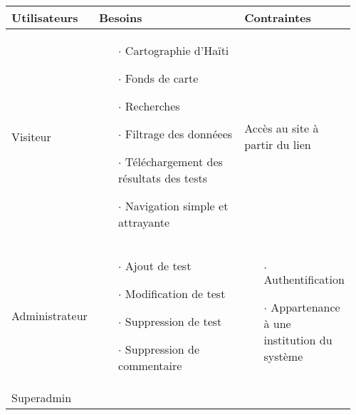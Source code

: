 \par    
\begin{table}
        \centering
        \begin{tabular}{|p{0.21\linewidth}|p{0.54\linewidth}|p{0.21\linewidth}|}
        \hline
                \textbf{Utilisateurs} & \textbf{Besoins} & 
                \textbf{Contraintes}  \\
                \hline
                        Visiteur & 
                        \begin{itemize}
                                 \item[$\cdot$]  Cartographie d'Haïti
                                 \item[$\cdot$]  Fonds de carte
                                 \item[$\cdot$]  Recherches
                                 \item[$\cdot$]  Filtrage des donnéees
                                 \item[$\cdot$]  Téléchargement des résultats des tests
                                 \item[$\cdot$]  Navigation simple et attrayante
                        \end{itemize} & 
                        Accès au site à partir du lien \\
                \hline
                        Administrateur & 
                        \begin{itemize}
                                \item[$\cdot$]  Ajout de test
                                \item[$\cdot$]  Modification de test
                                \item[$\cdot$]  Suppression de test
                                \item[$\cdot$]  Suppression de commentaire
                        \end{itemize} & 
                        \begin{itemize}
                                \item[$\cdot$] Authentification 
                                \item[$\cdot$] Appartenance à une institution du système 
                        \end{itemize}
                         \\
                \hline
                        Superadmin & 
                        \begin{itemize}

\end{itemize}
\end{tabular}
\end{table}
